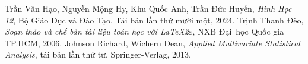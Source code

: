 \begin{thebibliography}{9}
Trần Văn Hạo, Nguyễn Mộng Hy, Khu Quốc Anh, Trần Đức Huyến,
{\em Hình Học 12},
Bộ Giáo Dục và Đào Tạo, 
Tái bản lần thứ mười một, 2024.
Trịnh Thanh Đèo,
{\em Soạn thảo và chế bản tài liệu toán học với \LaTeX2$\varepsilon$},
NXB Đại~học Quốc gia TP.HCM, 2006.
Johnson Richard, Wichern Dean,
{\em Applied Multivariate Statistical Analysis}, tái bản lần thứ tư, Springer-Verlag, 2013.
\end{thebibliography}
